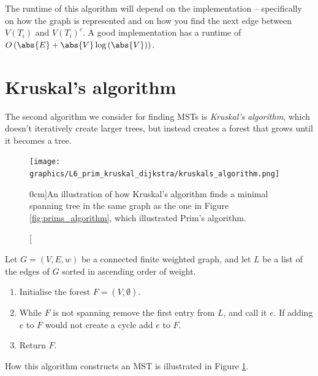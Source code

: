 \documentclass[nobib]{tufte-handout}
\begin{document}
\begin{remark}
  The runtime of this algorithm will depend on the implementation -- specifically on how the graph is represented and on how you find the next edge between $V(T_i)$ and $V(T_i)^c$. A good implementation has a runtime of $O\left(\abs{E} + \abs{V}\log\left(\abs{V}\right)\right)$.
\end{remark}

\section{Kruskal's algorithm}

The second algorithm we consider for finding MSTs is \emph{Kruskal's algorithm}, which doesn't iteratively create larger trees, but instead creates a forest that grows until it becomes a tree.

\begin{figure}
  \centering
  \texttt{[image: graphics/L6\_prim\_kruskal\_dijkstra/kruskals\_algorithm.png]}
  \caption[][0cm]{An illustration of how Kruskal's algorithm finds a minimal spanning tree in the same graph as the one in Figure \ref{fig:prims_algorithm}, which illustrated Prim's algorithm.}
  \label{fig:kruskals_algorithm}
\end{figure}

\begin{definition}
  Let $G = (V,E,w)$ be a connected finite weighted graph, and let $L$ be a list of the edges of $G$ sorted in ascending order of weight.
  \begin{enumerate}
      \item Initialise the forest $F = (V, \emptyset)$. 
      \item While $F$ is not spanning remove the first entry from $L$, and call it $e$. If adding $e$ to $F$ would not create a cycle add $e$ to $F$.
      \item Return $F$.
    \end{enumerate}
  How this algorithm constructs an MST is illustrated in Figure \ref{fig:kruskals_algorithm}.
\end{definition}
\end{document}
